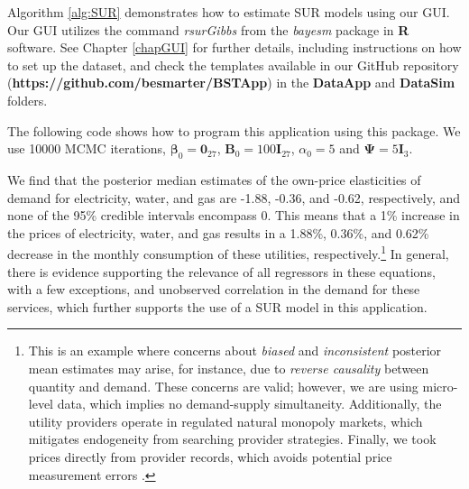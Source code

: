 Algorithm \ref{alg:SUR} demonstrates how to estimate SUR models using our GUI. Our GUI utilizes the command \textit{rsurGibbs} from the \textit{bayesm} package in \textbf{R} software. See Chapter \ref{chapGUI} for further details, including instructions on how to set up the dataset, and check the templates available in our GitHub repository (\textbf{https://github.com/besmarter/BSTApp}) in the \textbf{DataApp} and \textbf{DataSim} folders.

The following code shows how to program this application using this package. We use 10000 MCMC iterations, $\bm{\beta}_0=\bm{0}_{27}$, $\bm{B}_0=100\bm{I}_{27}$, $\alpha_0=5$ and $\bm{\Psi}=5\bm{I}_3$.

We find that the posterior median estimates of the own-price elasticities of demand for electricity, water, and gas are -1.88, -0.36, and -0.62, respectively, and none of the 95\% credible intervals encompass 0. This means that a 1\% increase in the prices of electricity, water, and gas results in a 1.88\%, 0.36\%, and 0.62\% decrease in the monthly consumption of these utilities, respectively.\footnote{This is an example where concerns about \textit{biased} and \textit{inconsistent} posterior mean estimates may arise, for instance, due to \textit{reverse causality} between quantity and demand. These concerns are valid; however, we are using micro-level data, which implies no demand-supply simultaneity. Additionally, the utility providers operate in regulated natural monopoly markets, which mitigates endogeneity from searching provider strategies. Finally, we took prices directly from provider records, which avoids potential price measurement errors \cite{ramirez2024welfare}.} In general, there is evidence supporting the relevance of all regressors in these equations, with a few exceptions, and unobserved correlation in the demand for these services, which further supports the use of a SUR model in this application.

